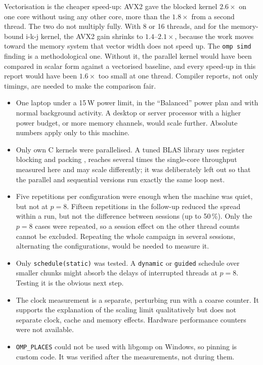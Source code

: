 \documentclass[11pt,a4paper]{article}
\newcommand{\concept}[1]{\par\addvspace{8pt}\Needspace{5\baselineskip}%
  \noindent{\color{accent}\bfseries\boldmath #1}\par\nopagebreak\vspace{2pt}}
\begin{document}
\concept{Vectorisation and threads}
Vectorisation is the cheaper speed-up: AVX2 gave the blocked kernel $2.6\times$ on one core
without using any other core, more than the $1.8\times$ from a second thread. The two do not
multiply fully. With 8 or 16 threads, and for the memory-bound i-k-j kernel, the AVX2 gain
shrinks to $1.4$--$2.1\times$, because the work moves toward the memory system that vector
width does not speed up. The \texttt{omp simd} finding is a methodological one. Without it,
the parallel kernel would have been compared in scalar form against a vectorised baseline, and
every speed-up in this report would have been $1.6\times$ too small at one thread. Compiler
reports, not only timings, are needed to make the comparison fair.

\concept{Limitations}
\begin{itemize}[leftmargin=1.4em]
  \item One laptop under a 15\,W power limit, in the ``Balanced'' power plan and with normal
        background activity. A desktop or server processor with a higher power budget, or more
        memory channels, would scale further. Absolute numbers apply only to this machine.
  \item Only own C kernels were parallelised. A tuned BLAS library uses register blocking and
        packing \cite{goto}, reaches several times the single-core throughput measured here and
        may scale differently; it was deliberately left out so that the parallel and sequential
        versions run exactly the same loop nest.
  \item Five repetitions per configuration were enough when the machine was quiet, but not at
        $p=8$. Fifteen repetitions in the follow-up reduced the spread within a run, but not
        the difference between sessions (up to 50\,\%). Only the $p=8$ cases were repeated, so
        a session effect on the other thread counts cannot be excluded. Repeating the whole
        campaign in several sessions, alternating the configurations, would be needed to
        measure it.
  \item Only \texttt{schedule(static)} was tested. A \texttt{dynamic} or \texttt{guided}
        schedule over smaller chunks might absorb the delays of interrupted threads at
        $p=8$. Testing it is the obvious next step.
  \item The clock measurement is a separate, perturbing run with a coarse counter. It supports
        the explanation of the scaling limit qualitatively but does not separate clock, cache
        and memory effects. Hardware performance counters were not available.
  \item \texttt{OMP\_PLACES} could not be used with libgomp on Windows, so pinning is custom
        code. It was verified after the measurements, not during them.
\end{itemize}
\end{document}
